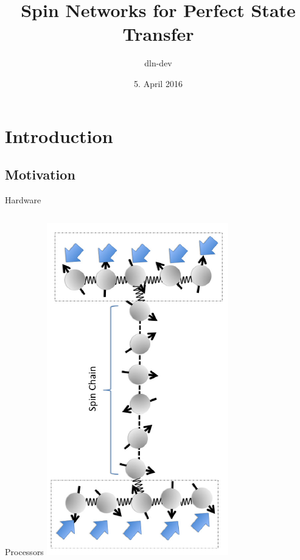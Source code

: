 \documentclass{beamer}
\begin{document}
\title{Spin Networks for Perfect State Transfer}
\author{dln-dev}
\date{5. April 2016}

\frame{\titlepage}

\section{Introduction}
\subsection{Motivation}
\begin{frame}{Hardware}
	\begin{columns}[T]
		\begin{column}{0.33\textwidth}
			\centering
   			Processors
   			\includegraphics[width=\textwidth]{Images/processor}

\end{column}
\end{columns}
\end{frame}
\end{document}
